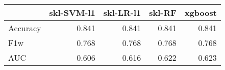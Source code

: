 \begin{tabular}{lrrrr}
\toprule
{} &  skl-SVM-l1 &  skl-LR-l1 &  skl-RF &  xgboost \\
\midrule
Accuracy &       0.841 &      0.841 &   0.841 &    0.841 \\
F1w      &       0.768 &      0.768 &   0.768 &    0.768 \\
AUC      &       0.606 &      0.616 &   0.622 &    0.623 \\
\bottomrule
\end{tabular}
